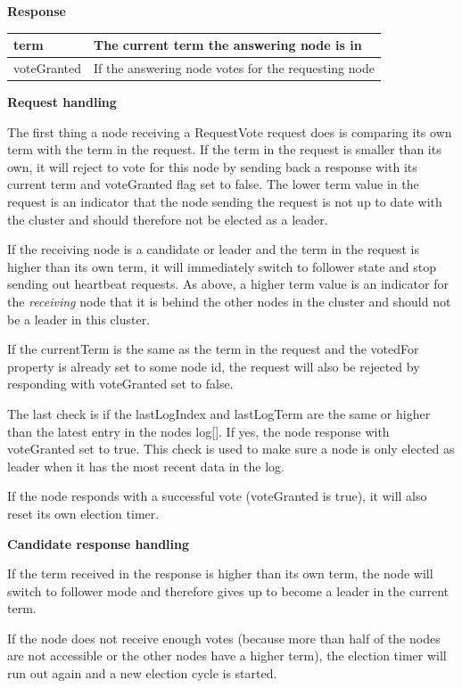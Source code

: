 \textbf{Response}

\begin{tabular}{ | l | p{13.7cm} | }
\hline
term & The current term the answering node is in \\ \hline
voteGranted & If the answering node votes for the requesting node \\ \hline
\end{tabular}

\textbf{Request handling}

The first thing a node receiving a RequestVote request does is comparing its own term with the term in the request. If the term in the request is smaller than its own, it will reject to vote for this node by sending back a response with its current term and voteGranted flag set to false. The lower term value in the request is an indicator that the node sending the request is not up to date with the cluster and should therefore not be elected as a leader.

If the receiving node is a candidate or leader and the term in the request is higher than its own term, it will immediately switch to follower state and stop sending out heartbeat requests.
As above, a higher term value is an indicator for the \textit{receiving} node that it is behind the other nodes in the cluster and should not be a leader in this cluster.

If the currentTerm is the same as the term in the request and the votedFor property is already set to some node id, the request will also be rejected by responding with voteGranted set to false.

The last check is if the lastLogIndex and lastLogTerm are the same or higher than the latest entry in the nodes log[]. If yes, the node response with voteGranted set to true. This check is used to make sure a node is only elected as leader when it has the most recent data in the log.

If the node responds with a successful vote (voteGranted is true), it will also reset its own election timer.

\textbf{Candidate response handling}

If the term received in the response is higher than its own term, the node will switch to follower mode and therefore gives up to become a leader in the current term.

If the node does not receive enough votes (because more than half of the nodes are not accessible or the other nodes have a higher term), the election timer will run out again and a new election cycle is started.

